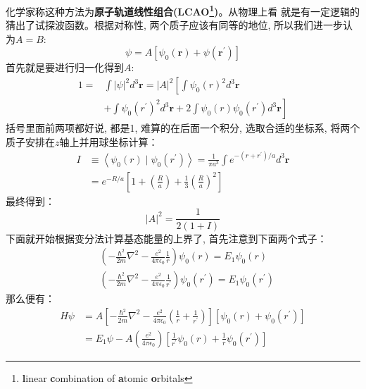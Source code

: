 \documentclass[a4paper,zihao=-4,linespread=1]{ctexrep}
\begin{document}
    化学家称这种方法为\textbf{原子轨道线性组合(LCAO\footnote{\textbf{l}inear \textbf{c}ombination of \textbf{a}tomic \textbf{o}rbitals})}。从物理上看
    就是有一定逻辑的猜出了试探波函数。根据对称性, 两个质子应该有同等的地位, 所以我们进一步认为$A=B$:
    \begin{equation}
        \label{eq:8.12}
        \psi = A\left[\psi_0(\mathbf{r})+\psi(\mathbf{r^\prime})\right]
    \end{equation}
    首先就是要进行归一化得到$A$:
    \begin{equation}
        \begin{aligned}
            1= & \int|\psi|^{2} d^{3} \mathbf{r}=|A|^{2}\left[\int \psi_{0}(r)^{2} d^{3} \mathbf{r}\right. \\
            & \left.+\int \psi_{0}\left(r^{\prime}\right)^{2} d^{3} \mathbf{r}+2 \int \psi_{0}(r) \psi_{0}\left(r^{\prime}\right) d^{3} \mathbf{r}\right]
        \end{aligned}
    \end{equation}
    括号里面前两项都好说, 都是1, 难算的在后面一个积分, 选取合适的坐标系, 将两个质子安排在$z$轴上并用球坐标计算：
    \begin{equation}
        \label{eq:8.14}
        \begin{aligned}
            I &\equiv\left\langle\psi_{0}(r) \mid \psi_{0}\left(r^{\prime}\right)\right\rangle=\frac{1}{\pi a^{3}} \int e^{-\left(r+r^{\prime}\right) / a} d^{3} \mathbf{r}\\
            &=e^{-R / a}\left[1+\left(\frac{R}{a}\right)+\frac{1}{3}\left(\frac{R}{a}\right)^{2}\right]
        \end{aligned}
    \end{equation}
    最终得到：
    \[|A|^{2}=\frac{1}{2(1+I)}\]
    下面就开始根据变分法计算基态能量的上界了, 首先注意到下面两个式子：
    \begin{equation}
        \label{eq:8.15}
        \begin{aligned}
        &\left(-\frac{\hbar^{2}}{2 m} \nabla^{2}-\frac{e^{2}}{4 \pi \epsilon_{0}} \frac{1}{r}\right) \psi_{0}(r)=E_{1} \psi_{0}(r)\\
        &\left(-\frac{\hbar^{2}}{2 m} \nabla^{2}-\frac{e^{2}}{4 \pi \epsilon_{0}} \frac{1}{r^\prime}\right) \psi_{0}(r^\prime)=E_{1} \psi_{0}(r^\prime)
        \end{aligned}
    \end{equation}
    那么便有：
    \begin{equation}
        \begin{aligned}
            H \psi & =A\left[-\frac{\hbar^{2}}{2 m} \nabla^{2}-\frac{e^{2}}{4 \pi \epsilon_{0}}\left(\frac{1}{r}+\frac{1}{r^{\prime}}\right)\right]\left[\psi_{0}(r)+\psi_{0}\left(r^{\prime}\right)\right] \\
            & =E_{1} \psi-A\left(\frac{e^{2}}{4 \pi \epsilon_{0}}\right)\left[\frac{1}{r^{\prime}} \psi_{0}(r)+\frac{1}{r} \psi_{0}\left(r^{\prime}\right)\right] 
        \end{aligned}
    \end{equation}
\end{document}
